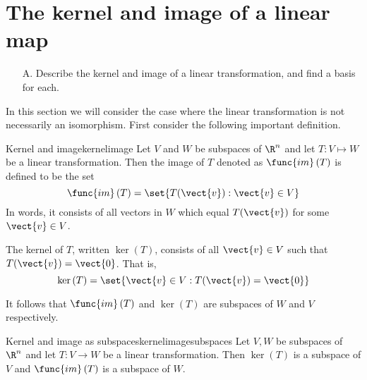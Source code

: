 \section{The kernel and image of a linear map}

\begin{outcome}
\begin{enumerate}
\item[A.]  Describe the kernel and image of a linear transformation, and find a basis for each. 
\end{enumerate}
\end{outcome}

In this section we will consider the case where the linear transformation is not necessarily an
isomorphism. First consider the following important definition.

\begin{definition}{Kernel and image}{kernelimage}
Let $V$ and $W$ be subspaces of $\R^n$ and let $T:V\mapsto W$ be a linear transformation. Then the image of $T$
denoted as $\func{im}\left( T\right) $ is defined to be the set 
\begin{equation*}
\func{im}\left( T\right) = \set{T (\vect{v}):\vect{v}\in V}
\end{equation*}
In words, it consists of all vectors in $W$ which equal $T(\vect{v})$ for some $
\vect{v}\in V$.

The kernel of $T$, written $\ker \left( T\right) $, consists of all $\vect{v}\in V$ such that $T(\vect{v})=\vect{0}$. That is, 
\begin{equation*}
\ker \left( T\right) =\set{\vect{v}\in V:T(\vect{v})=\vect{0}}
\end{equation*}
\end{definition}

It follows that $\func{im}\left( T\right) $ and $\ker \left( T\right) $
are subspaces of $W$ and $V$ respectively.

\begin{proposition}{Kernel and image as subspaces}{kernelimagesubspaces}
Let $V, W$ be subspaces of $\R^n$ and let $T:V\rightarrow W$ be a linear transformation. Then $\ker \left(
T\right) $ is a subspace of $V$ and $\func{im}\left( T\right) $ is a
subspace of $W$.
\end{proposition}

